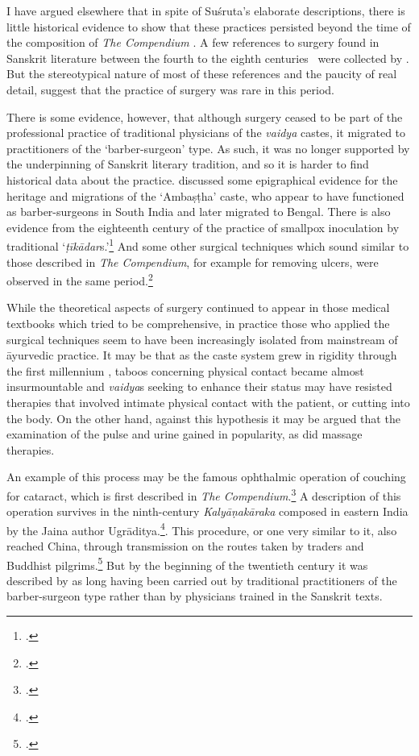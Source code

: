 I have argued elsewhere that in spite of Suśruta's elaborate descriptions, there
is little historical evidence to show that these practices persisted beyond the
time of the composition of \emph{The Compendium} \citep{wuja-indi}. A few
references to surgery found in Sanskrit literature between the fourth to the
eighth centuries \AD\ were collected by \citet[74--8]{shar-1972}.  But the
stereotypical nature of most of these references and the paucity of real detail,
suggest that the practice of surgery was rare in this period.

There is some evidence, however, that although surgery ceased to be part of
the professional practice of traditional physicians of the \emph{vaidya}
castes, it migrated to practitioners of the `barber-surgeon' type.  As such,
it was no longer supported by the underpinning of Sanskrit literary
tradition, and so it is harder to find historical data about the
practice. \citet{sirc-raks} discussed some epigraphical evidence for the
heritage and migrations of the `Ambaṣṭha' caste, who appear to have
functioned as barber-surgeons in South India and later migrated to Bengal.
There is also evidence from the eighteenth century of the practice of
smallpox inoculation by traditional 
`\emph{ṭīkādar}s.'\footcite{holw-acco,coul-acco} And some other surgical 
techniques which sound
similar to those described in \emph{The Compendium}, for example for removing 
ulcers, were
observed in the same period.\footcite[79]{babe-scie}


While the theoretical aspects of surgery continued to appear in those
medical textbooks which tried to be comprehensive, in practice those who
applied the surgical techniques seem to have been increasingly isolated from
mainstream of āyurvedic practice. It may be that as the caste system grew in
rigidity through the first millennium \AD, taboos concerning physical
contact became almost insurmountable and \emph{vaidya}s seeking to enhance
their status may have resisted therapies that involved intimate physical
contact with the patient, or cutting into the body.  On the other hand,
against this hypothesis it may be argued that the examination of the pulse
and urine gained in popularity, as did massage therapies.

An example of this process may be the famous ophthalmic operation of couching 
for
cataract, which is first described in \emph{The Compendium}.\footcite[Well
outlined by][378--9]{majn-1975} A description of this operation survives in the
ninth-century \emph{Kalyāṇa\-kāraka} composed in eastern India by the Jaina 
author
Ugrāditya.\footcites[67, n.\,76]{meul-1984}[IIA, 151\,ff]{meul-hist}[366--368,
375--378]{shas-kaly}. This procedure, or one very similar to it, also reached
China, through transmission on the routes taken by traders and Buddhist
pilgrims.\footcites[132--48]{unsc-medi}{desh-1999,desh-2000} But by the 
beginning
of the twentieth century it was described by \citet{elli-indi} as long having been
carried out by traditional practitioners of the barber-surgeon type rather than by
physicians trained in the Sanskrit texts.


